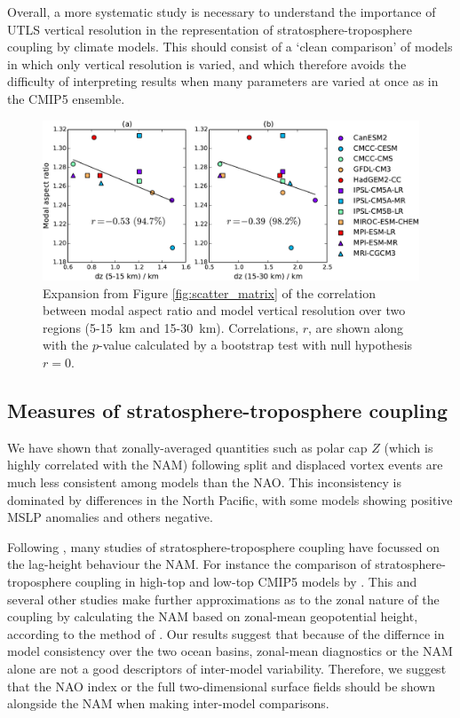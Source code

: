 Overall, a more systematic study is necessary to understand the importance of
UTLS vertical resolution in the representation of stratosphere-troposphere
coupling by climate models. This should consist of a `clean comparison' of
models in which only vertical resolution is varied, and which therefore avoids
the difficulty of interpreting results when many parameters are varied at once
as in the CMIP5 ensemble.




\begin{figure}
 \centering
 \noindent\includegraphics[width=\textwidth]{figures/chapter-models/aspect_ratio_resolution.pdf}
 \caption[Vertical resolution and modal aspect ratio.]{Expansion from Figure
   \ref{fig:scatter_matrix} of the correlation between modal aspect ratio and
   model vertical resolution over two regions (5-15~km and
   15-30~km). Correlations, $r$, are shown along with the $p$-value calculated by a
   bootstrap test with null hypothesis $r=0$.}
 \label{fig:aspect_vert_res}
\end{figure}


\subsection{Measures of stratosphere-troposphere coupling}

We have shown that zonally-averaged quantities such as polar cap $Z$ (which is
highly correlated with the NAM) following split and displaced vortex events are
much less consistent among models than the NAO. This inconsistency is dominated
by differences in the North Pacific, with some models showing positive MSLP
anomalies and others negative.

Following \citet{Baldwin2001a}, many studies of stratosphere-troposphere
coupling have focussed on the lag-height behaviour the NAM. For instance the
comparison of stratosphere-troposphere coupling in high-top and low-top CMIP5
models by \citet{Charlton-Perez2013}. This and several other studies make
further approximations as to the zonal nature of the coupling by calculating the
NAM based on zonal-mean geopotential height, according to the method of
\citet{Baldwin2009}. Our results suggest that because of the differnce in model
consistency over the two ocean basins, zonal-mean diagnostics or the NAM alone
are not a good descriptors of inter-model variability. Therefore, we suggest
that the NAO index or the full two-dimensional surface fields should be shown
alongside the NAM when making inter-model comparisons.

